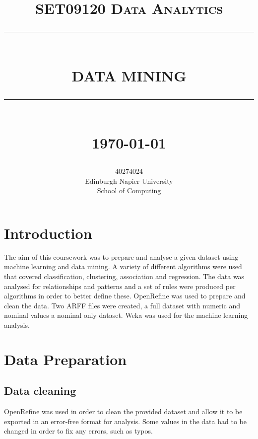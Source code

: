 \documentclass[12pt]{article}
\newcommand{\HRule}[1]{\rule{\linewidth}{#1}}
\begin{document}
\title{ \normalsize \textsc{SET09120 Data Analytics}
        \\ [2.0cm]
        \HRule{0.5pt} \\
        \LARGE \textbf{\uppercase{Data Mining}}
        \HRule{2pt} \\ [0.5cm]
        \normalsize \monthyeardate\today \vspace*{5\baselineskip}}

\author{
        40274024 \\ 
        Edinburgh Napier University \\
        School of Computing 
        \date{}}

\maketitle

\newpage

\sectionfont{\scshape}


\section{Introduction}
The aim of this coursework was to prepare and analyse a given dataset using machine learning and data mining. A variety of different algorithms were used that covered classification, clustering, association and regression. The data was analysed for relationships and patterns and a set of rules were produced per algorithms in order to better define these. OpenRefine was used to prepare and clean the data. Two ARFF files were created, a full dataset with numeric and nominal values a nominal only dataset. Weka was used for the machine learning analysis.


\section{Data Preparation}
\subsection{Data cleaning}
OpenRefine was used in order to clean the provided dataset and allow it to be exported in an error-free format for analysis.
Some values in the data had to be changed in order to fix any errors, such as typos.
\end{document}
